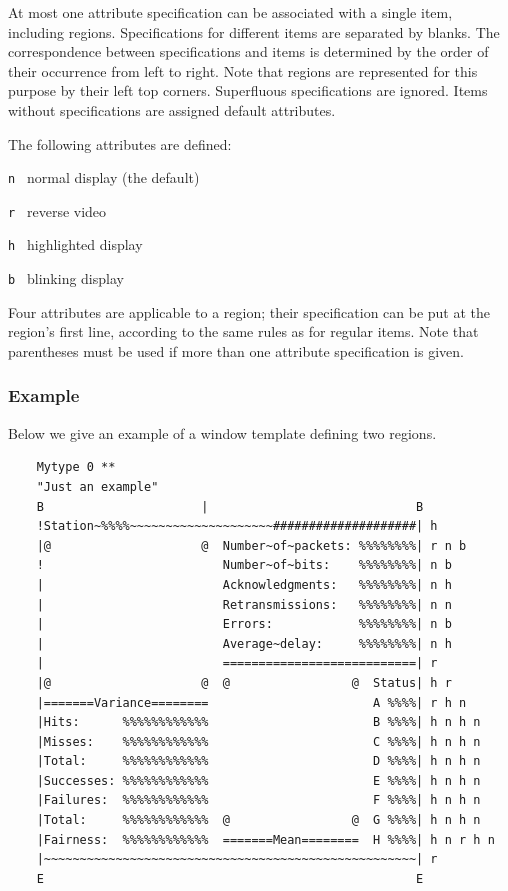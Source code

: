 At most one attribute specification can be associated with a single item,
including regions.
Specifications for different items are separated by blanks.
The correspondence between specifications and items is determined by the
order of their occurrence from left to right.
Note that regions are represented for this purpose by their left top
corners.
Superfluous specifications are ignored.
Items without specifications are assigned default attributes.

The following attributes are defined:

\bigskip

\noindent
{\tt n~} normal display (the default)

\noindent
{\tt r~} reverse video

\noindent
{\tt h~} highlighted display

\noindent
{\tt b~} blinking display

\bigskip

Four attributes are applicable to a region; their specification can be put
at the region's first line, according to the same rules as for regular items.
Note that parentheses must be used if more than one attribute specification is
given. 

\subsubsection*{Example}

\noindent
Below we give an example of a window template defining two regions.
{\small
\begin{verbatim}
    Mytype 0 **
    "Just an example"
    B                      |                             B
    !Station~%%%%~~~~~~~~~~~~~~~~~~~~####################| h
    |@                     @  Number~of~packets: %%%%%%%%| r n b
    !                         Number~of~bits:    %%%%%%%%| n b
    |                         Acknowledgments:   %%%%%%%%| n h
    |                         Retransmissions:   %%%%%%%%| n n
    |                         Errors:            %%%%%%%%| n b
    |                         Average~delay:     %%%%%%%%| n h
    |                         ===========================| r
    |@                     @  @                 @  Status| h r
    |=======Variance========                       A %%%%| r h n
    |Hits:      %%%%%%%%%%%%                       B %%%%| h n h n
    |Misses:    %%%%%%%%%%%%                       C %%%%| h n h n
    |Total:     %%%%%%%%%%%%                       D %%%%| h n h n
    |Successes: %%%%%%%%%%%%                       E %%%%| h n h n
    |Failures:  %%%%%%%%%%%%                       F %%%%| h n h n
    |Total:     %%%%%%%%%%%%  @                 @  G %%%%| h n h n
    |Fairness:  %%%%%%%%%%%%  =======Mean========  H %%%%| h n r h n
    |~~~~~~~~~~~~~~~~~~~~~~~~~~~~~~~~~~~~~~~~~~~~~~~~~~~~| r
    E                                                    E
\end{verbatim}}

